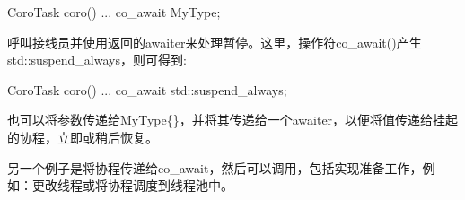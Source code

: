 \begin{cpp}
CoroTask coro()
{
	...
	co_await MyType{};
}
\end{cpp}

呼叫接线员并使用返回的awaiter来处理暂停。这里，操作符co\_await()产生std::suspend\_always{}，则可得到:

\begin{cpp}
CoroTask coro()
{
	...
	co_await std::suspend_always{};
}
\end{cpp}

也可以将参数传递给MyType\{\}，并将其传递给一个awaiter，以便将值传递给挂起的协程，立即或稍后恢复。

另一个例子是将协程传递给co\_await，然后可以调用，包括实现准备工作，例如：更改线程或将协程调度到线程池中。













